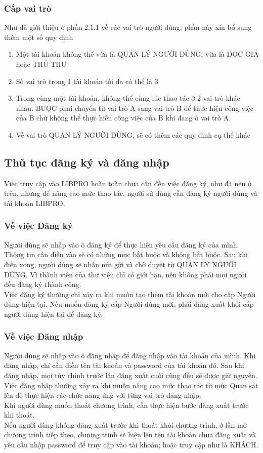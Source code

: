 \documentclass[12pt,a4paper]{report}
\begin{document}
			\subsubsection{Cấp vai trò}
			Như đã giới thiệu ở phần 2.1.1 về các vai trò người dùng, phần này xin bổ sung thêm một số quy định
			\begin{enumerate}
				\item Một tài khoản không thể vừa là QUẢN LÝ NGƯỜI DÙNG, vừa là ĐỘC GIẢ hoặc THỦ THƯ
				\item Số vai trò trong 1 tài khoản tối đa có thể là 3
				\item Trong cùng một tài khoản, không thể cùng lúc thao tác ở 2 vai trò khác nhau. BUỘC phải chuyển từ vai trò A sang vai trò B để thực hiện công việc của B chứ không thể thực hiên công việc của B khi đang ở vai trò A.
				\item Về vai trò QUẢN LÝ NGƯỜI DÙNG, sẽ có thêm các quy định cụ thể khác
			\end{enumerate}
		\subsection{Thủ tục đăng ký và đăng nhập}
		Viêc truy cập vào LIBPRO hoàn toàn chưa cần đến việc đăng ký, như đã nêu ở trên, nhưng để nâng cao mức thao tác, người sử dùng cần đăng ký người dùng và tài khoản LIBPRO.\\
			\subsubsection{Về việc Đăng ký}
			Người dùng sẽ nhấp vào ô đăng ký để thực hiên yêu cầu đăng ký của mình. Thông tin cần điền vào sẽ có những mục bắt buộc và không bắt buộc. Sau khi điền xong, người dùng sẽ nhấn nút gửi và chờ duyệt từ QUẢN LÝ NGƯỜI DÙNG. Vì thành viên của thư viện chỉ có giới hạn, nên không phải mọi người đều đăng ký thành công.\\
			Việc đăng ký thường chỉ xảy ra khi muốn tạo thêm tài khoản mới cho cấp Người dùng hiện tại. Nếu muốn đăng ký cấp Người dùng mới, phải đăng xuất khỏi cấp người dùng hiện tại để đăng ký.\\
			\subsubsection{Về việc Đăng nhập}
			Người dùng sẽ nhấp vào ô đăng nhập để đăng nhập vào tài khoản của mình. Khi đăng nhập, chỉ cần điền tên tài khoản và password của tài khoản đó. Sau khi đăng nhập, mọi tùy chỉnh trước lần đăng xuất cuối cùng đều sẽ được giữ nguyên.\\
			Việc đăng nhập thường xảy ra khi muốn nâng cao mức thao tác từ mức Quan sát lên để thực hiện các chức năng ứng với từng vai trò đăng nhập.\\
			Khi người dùng muốn thoát chương trình, cần thực hiện bước đăng xuất trước khi thoát.\\
			Nếu người dùng không đăng xuất trước khi thoát khỏi chương trình, ở lần mở chương trình tiếp theo, chương trình sẽ hiện lên tên tài khoản chưa đăng xuất và yêu cầu nhập password để truy cập vào tài khoản; hoặc truy cập như là KHÁCH.\\
\end{document}
